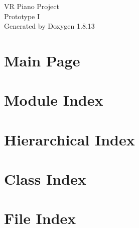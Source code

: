 \documentclass[twoside]{book}
\newcommand{\+}{\discretionary{\mbox{\scriptsize$\hookleftarrow$}}{}{}}
\newcommand{\clearemptydoublepage}{%
  \newpage{\pagestyle{empty}\cleardoublepage}%
}
\begin{document}
\hypersetup{pageanchor=false,
             bookmarksnumbered=true,
             pdfencoding=unicode
            }
\begin{titlepage}
\vspace*{7cm}
\begin{center}%
{\Large VR Piano Project \\[1ex]\large Prototype I }\\
\vspace*{1cm}
{\large Generated by Doxygen 1.8.13}\\
\end{center}
\end{titlepage}
\clearemptydoublepage
{}
\tableofcontents
\clearemptydoublepage
{}
\hypersetup{pageanchor=true}

\chapter{Main Page}
\label{index}\hypertarget{index}{}
\chapter{Module Index}

\chapter{Hierarchical Index}

\chapter{Class Index}

\chapter{File Index}

\end{document}
